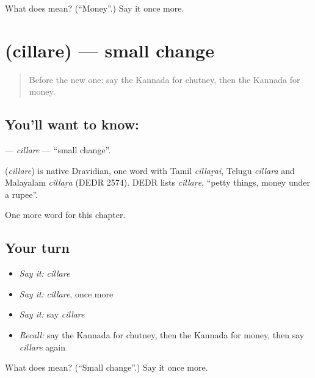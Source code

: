 \begin{tcolorbox}[breakable,colback=teal!4,colframe=teal!35!black,title={Before you move on}]
What does  mean? (\textquotedblleft{}Money\textquotedblright{}.) Say it once more.
\end{tcolorbox}
\section[\texorpdfstring{\kn{ಚಿಲ್ಲರೆ} (cillare)}{ಚಿಲ್ಲರೆ (cillare)}]{ (cillare) — small change}

\label{lesson:KA-C294-cillare}



\begin{quote}
Before the new one: say the Kannada for chutney, then the Kannada for money.
\end{quote}

\subsection*{You'll want to know: }
\textbf{} — \emph{cillare} — \textquotedblleft{}small change\textquotedblright{}.

\begin{cousinweb}
\textbf{} (\emph{cillare}) is native Dravidian, one word with Tamil \emph{cillaṟai}, Telugu \emph{cillara} and Malayalam \emph{cillaṟa} (DEDR 2574). DEDR lists \emph{cillaṟe}, \textquotedblleft{}petty things, money under a rupee\textquotedblright{}.
\end{cousinweb}

\begin{grammarlens}[title={What you've built}]
One more word for this chapter.
\end{grammarlens}

\subsection*{Your turn}
\begin{itemize}
\raggedright
  \item \emph{Say it:} \emph{cillare}
  \item \emph{Say it:} \emph{cillare}, once more
  \item \emph{Say it:} say \emph{cillare}
  \item \emph{Recall:} say the Kannada for chutney, then the Kannada for money, then say \emph{cillare} again
\end{itemize}

\begin{tcolorbox}[breakable,colback=teal!4,colframe=teal!35!black,title={Before you move on}]
What does  mean? (\textquotedblleft{}Small change\textquotedblright{}.) Say it once more.
\end{tcolorbox}
